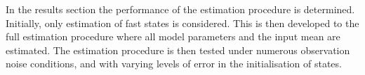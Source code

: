 In the results section the performance of the estimation procedure is determined. Initially, only estimation of fast states is considered. This is then developed to the full estimation procedure where all model parameters and the input mean are estimated. The estimation procedure is then tested under numerous observation noise conditions, and with varying levels of error in the initialisation of states.
